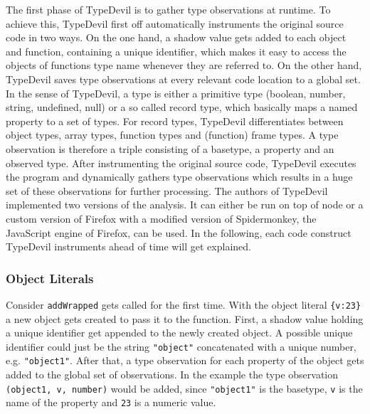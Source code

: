 \documentclass[runningheads,a4paper]{llncs}
\begin{document}
The first phase of TypeDevil is to gather type observations at runtime.
To achieve this, TypeDevil first off automatically instruments the original source code in two ways.
On the one hand, a shadow value gets added to each object and function, containing a unique identifier, which makes it easy to access the objects of functions type name whenever they are referred to. 
On the other hand, TypeDevil saves type observations at every relevant code location to a global set.
In the sense of TypeDevil, a type is either a primitive type (boolean, number, string, undefined, null) or a so called record type, which basically maps a named property to a set of types.
For record types, TypeDevil differentiates between object types, array types, function types and (function) frame types.
A type observation is therefore a triple consisting of a basetype, a property and an observed type.
After instrumenting the original source code, TypeDevil executes the program and dynamically gathers type observations which results in a huge set of these observations for further processing.
The authors of TypeDevil implemented two versions of the analysis. 
It can either be run on top of node or a custom version of Firefox with a modified version of Spidermonkey, the JavaScript engine of Firefox, can be used.
In the following, each code construct TypeDevil instruments ahead of time will get explained.

\subsubsection{Object Literals}
Consider \lstinline[columns=fixed]{addWrapped} gets called for the first time.
With the object literal \lstinline[columns=fixed]!{v:23}! a new object gets created to pass it to the function.
First, a shadow value holding a unique identifier get appended to the newly created object. A possible unique identifier could just be the string \lstinline[columns=fixed]{"object"} concatenated with a unique number, e.g. \lstinline[columns=fixed]{"object1"}.
After that, a type observation for each property of the object gets added to the global set of observations.
In the example the type observation \lstinline[columns=fixed]{(object1, v, number)} would be added, since \lstinline[columns=fixed]{"object1"} is the basetype, \lstinline[columns=fixed]{v} is the name of the property and \lstinline[columns=fixed]{23} is a numeric value.
\end{document}
